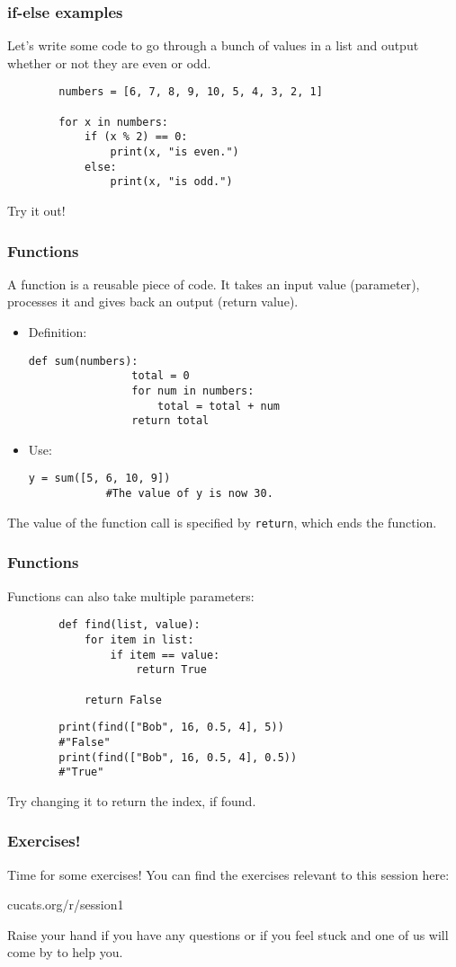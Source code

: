 \documentclass[presentation]{beamer}
\begin{document}
	\begin{frame}[fragile]
		\frametitle{if-else examples}
		
		Let's write some code to go through a bunch of values in a list and output whether or not they are even or odd.
		
		\pause
		\begin{lstlisting}
		numbers = [6, 7, 8, 9, 10, 5, 4, 3, 2, 1]
		
		for x in numbers:
		    if (x % 2) == 0:
		        print(x, "is even.")
		    else:
		        print(x, "is odd.")
		\end{lstlisting}
		\pause
		Try it out!
	\end{frame}
	
	\begin{frame}[fragile]
		\frametitle{Functions}
		
		A function is a reusable piece of code. It takes an input value (\colorbox{jargonbg}{parameter}), processes it and gives back an output (\colorbox{jargonbg}{return value}). \pause
		
		\begin{itemize}
			\item Definition:
			\begin{lstlisting}[xleftmargin=\dimexpr-\leftmargini]
			def sum(numbers):
			    total = 0
			    for num in numbers:
			        total = total + num
			    return total
			\end{lstlisting}
			\pause
			
			\item Use:
			\begin{lstlisting}[xleftmargin=\dimexpr-\leftmargini]
			y = sum([5, 6, 10, 9])
			#The value of y is now 30.
			\end{lstlisting}
		\end{itemize}
		
		The value of the function call is specified by \lstinline|return|, which ends the function.
	\end{frame}
	
	\begin{frame}[fragile]
		\frametitle{Functions}
		Functions can also take multiple parameters:
		\begin{lstlisting}
		def find(list, value):
		    for item in list:
		        if item == value:
		            return True
		
		    return False
		\end{lstlisting}
		\begin{lstlisting}
		print(find(["Bob", 16, 0.5, 4], 5))
		#"False"
		print(find(["Bob", 16, 0.5, 4], 0.5))
		#"True"
		\end{lstlisting}
		
		\pause

		Try changing it to return the index, if found.
	\end{frame}

	\begin{frame}[fragile]
		\frametitle{Exercises!}
		Time for some exercises! You can find the exercises relevant to this session here:
		\vfill
		\centerline{\LARGE cucats.org/r/session1}
		\vfill
		Raise your hand if you have any questions or if you feel stuck and one of us will come by to help you.
	\end{frame}
\end{document}

